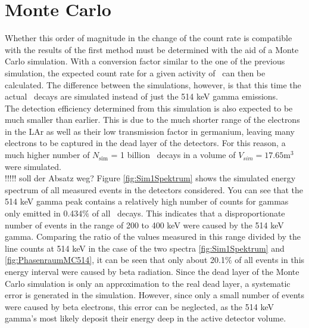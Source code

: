 \documentclass[encoding=utf8,british]{tumphthesis}
\begin{document}
\section{Monte Carlo}

Whether this order of magnitude in the change of the count rate is compatible with the results of the first method must be determined with the aid of a Monte Carlo simulation.
With a conversion factor similar to the one of the previous simulation, the expected count rate for a given activity of \Kr\ can then be calculated.
The difference between the simulations, however, is that this time the actual \Kr\ decays are simulated instead of just the 514 keV gamma emissions.
\\

The detection efficiency determined from this simulation is also expected to be much smaller than earlier.
This is due to the much shorter range of the electrons in the LAr as well as their low transmission factor in germanium, leaving many electrons to be captured in the dead layer of the detectors.
For this reason, a much higher number of $N_{\mathrm{sim}}$ = 1 billion \Kr\ decays in a volume of $V_{sim} = 17.65 \mathrm{m}^3$ were simulated.
\\

!!!!! soll der Absatz weg?
Figure \ref{fig:Sim1Spektrum} shows the simulated energy spectrum of all measured events in the detectors considered.
You can see that the 514 keV gamma peak contains a relatively high number of counts for gammas only emitted in 0.434$\%$ of all \Kr\ decays.
This indicates that a disproportionate number of events in the range of 200 to 400 keV were caused by the 514 keV gamma.
Comparing the ratio of the values measured in this range divided by the line counts at 514 keV in the case of the two spectra \ref{fig:Sim1Spektrum} and \ref{fig:PhasenraumMC514}, it can be seen that only about 20.1$\%$ of all events in this energy interval were caused by beta radiation.
Since the dead layer of the Monte Carlo simulation is only an approximation to the real dead layer, a systematic error is generated in the simulation.
However, since only a small number of events were caused by beta electrons, this error can be neglected, as the 514 keV gamma's most likely deposit their energy deep in the active detector volume. 
\\
\end{document}
